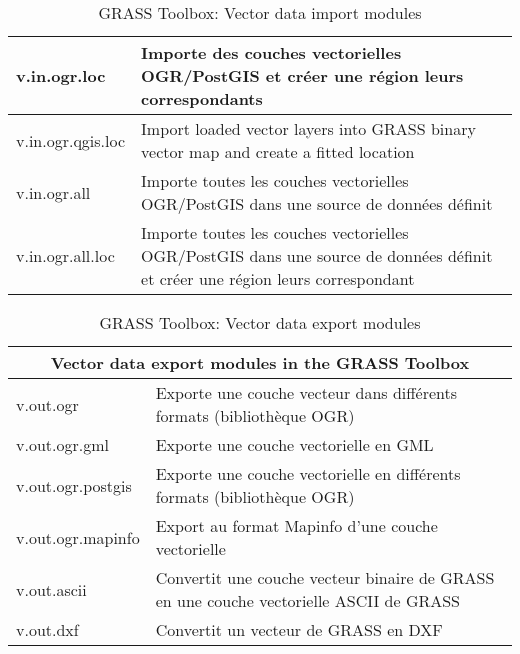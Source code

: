 \begin{table}[H]
\begin{tabular}{|p{2.5cm}|p{11.5cm}|}
  \hline v.in.ogr.loc & Importe des couches vectorielles OGR/PostGIS et créer une région leurs correspondants\\
  \hline v.in.ogr.qgis.loc & Import loaded vector layers into GRASS binary
  vector map and create a fitted location \\
  \hline v.in.ogr.all & Importe toutes les couches vectorielles OGR/PostGIS dans une source de données définit \\
  \hline v.in.ogr.all.loc & Importe toutes les couches vectorielles OGR/PostGIS dans une source de données définit et créer une région leurs correspondant\\
\hline
\end{tabular}
\caption{GRASS Toolbox: Vector data import modules}
\end{table}

\begin{table}[H]
\centering
 \begin{tabular}{|p{4cm}|p{10cm}|}
  \hline \multicolumn{2}{|c|}{\textbf{Vector data export modules in the GRASS
Toolbox}} \\
  \hline v.out.ogr & Exporte une couche vecteur dans différents formats (bibliothèque OGR) \\
  \hline v.out.ogr.gml & Exporte une couche vectorielle en GML \\
  \hline v.out.ogr.postgis & Exporte une couche vectorielle en différents formats (bibliothèque OGR) \\
  \hline v.out.ogr.mapinfo & Export au format Mapinfo d'une couche vectorielle\\
  \hline v.out.ascii & Convertit une couche vecteur binaire de GRASS en une couche vectorielle ASCII de GRASS\\
  \hline v.out.dxf & Convertit un vecteur de GRASS en DXF \\
\hline
\end{tabular}
\caption{GRASS Toolbox: Vector data export modules}
\end{table}

